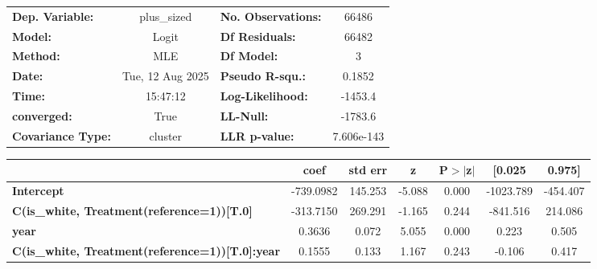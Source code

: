 \begin{center}
\begin{tabular}{lclc}
\toprule
\textbf{Dep. Variable:}                                 &   plus\_sized    & \textbf{  No. Observations:  } &    66486    \\
\textbf{Model:}                                         &      Logit       & \textbf{  Df Residuals:      } &    66482    \\
\textbf{Method:}                                        &       MLE        & \textbf{  Df Model:          } &        3    \\
\textbf{Date:}                                          & Tue, 12 Aug 2025 & \textbf{  Pseudo R-squ.:     } &   0.1852    \\
\textbf{Time:}                                          &     15:47:12     & \textbf{  Log-Likelihood:    } &   -1453.4   \\
\textbf{converged:}                                     &       True       & \textbf{  LL-Null:           } &   -1783.6   \\
\textbf{Covariance Type:}                               &     cluster      & \textbf{  LLR p-value:       } & 7.606e-143  \\
\bottomrule
\end{tabular}
\begin{tabular}{lcccccc}
                                                        & \textbf{coef} & \textbf{std err} & \textbf{z} & \textbf{P$> |$z$|$} & \textbf{[0.025} & \textbf{0.975]}  \\
\midrule
\textbf{Intercept}                                      &    -739.0982  &      145.253     &    -5.088  &         0.000        &    -1023.789    &     -454.407     \\
\textbf{C(is\_white, Treatment(reference=1))[T.0]}      &    -313.7150  &      269.291     &    -1.165  &         0.244        &     -841.516    &      214.086     \\
\textbf{year}                                           &       0.3636  &        0.072     &     5.055  &         0.000        &        0.223    &        0.505     \\
\textbf{C(is\_white, Treatment(reference=1))[T.0]:year} &       0.1555  &        0.133     &     1.167  &         0.243        &       -0.106    &        0.417     \\
\bottomrule
\end{tabular}
\end{center}